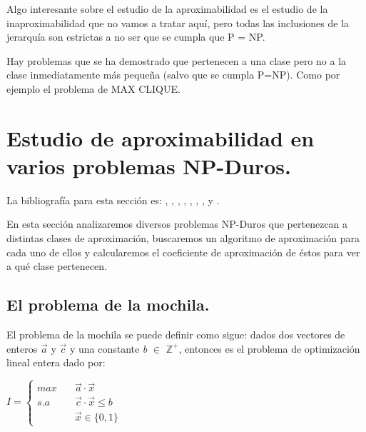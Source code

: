 \documentclass[a4paper,12pt,titlepage]{article}
\begin{document}
\vspace{\baselineskip}

Algo interesante sobre el estudio de la aproximabilidad es el estudio de la inaproximabilidad que no vamos a tratar aqu\'i, pero todas las inclusiones de la jerarqu\'ia son estrictas a no ser que se cumpla que P = NP.

Hay problemas que se ha demostrado que pertenecen a una clase pero no a la clase inmediatamente m\'as pequeña (salvo que se cumpla P=NP). Como por ejemplo el problema de MAX CLIQUE\cite{MAX_CLIQ_INA}.

\newpage

\section{Estudio de aproximabilidad en varios problemas NP-Duros.}

La bibliograf\'ia para esta secci\'on es: \cite{approx_core}, \cite{knapsack2}, \cite{max-pci1}, \cite{max-pci2}, \cite{max-pci3}, \cite{max-pci4}, \cite{mvc1}, \cite{TSP1} y \cite{TSP2}.

\vspace{0.3cm}

En esta secci\'on analizaremos diversos problemas NP-Duros que pertenezcan a distintas clases de aproximaci\'on, buscaremos un algoritmo de aproximaci\'on para cada uno de ellos y calcularemos el coeficiente de aproximaci\'on de \'estos para ver a qu\'e clase pertenecen.

\subsection{El problema de la mochila.}

El problema de la mochila se puede definir como sigue:
dados dos vectores de enteros $\overrightarrow{a}$ y $\overrightarrow{c}$ y una constante \textit{b} $\in$ $\mathbb{Z^+}$, entonces es el problema de optimizaci\'on lineal entera dado por:

\vspace{0.3cm}

$
I =
\left\{\begin{aligned}
max \quad & \overrightarrow{a}\cdot\overrightarrow{x} \\
s.a \quad & \overrightarrow{c}\cdot\overrightarrow{x} \leq \textit{b} \\
    & \overrightarrow{x} \in \{0,1\}
\end{aligned}\right.
$
\end{document}
